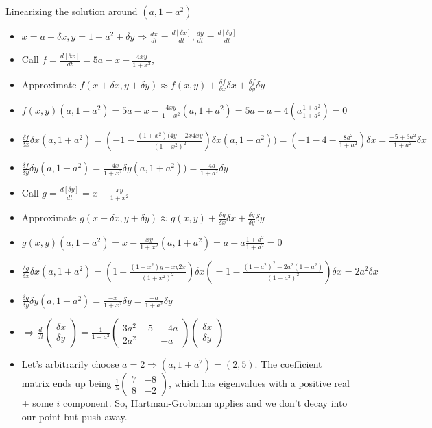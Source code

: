 \documentclass[11pt, oneside]{article}   	%
\begin{document}
Linearizing the solution around $(a, 1+a^2)$
\begin{itemize}
\item $x = a + \delta x, y = 1 + a^2 + \delta y \Rightarrow \frac{dx}{dt} = \frac{d[\delta x]}{dt}, \frac{dy}{dt} = \frac{d[\delta y]}{dt}$
\item Call $f =  \frac{d[\delta x]}{dt} = 5a - x - \frac{4xy}{1+x^2}$, 
\item Approximate $f(x + \delta x, y + \delta y) \approx f(x,y) + \frac{\delta f}{\delta x}\delta x +  \frac{\delta f}{\delta y}\delta y$
\item $f(x,y)(a, 1+a^2)= 5a - x - \frac{4xy}{1+x^2}(a, 1+a^2) = 5a - a - 4(a\frac{1+a^2}{1+a^2}) = 0$
\item $\frac{\delta f}{\delta x}\delta x (a, 1+a^2) = (-1 - \frac{(1+x^2)(4y-2x4xy}{(1+x^2)^2})\delta x (a, 1+a^2)) =(-1 - 4 - \frac{8a^2}{1+a^2})\delta x  = \frac{-5 + 3a^2}{1+a^2}\delta x $
\item $\frac{\delta f}{\delta y}\delta y (a, 1+a^2) = \frac{-4x}{1+x^2}\delta y (a, 1+a^2)) =\frac{-4a}{1+a^2}\delta y $
\item Call $g =  \frac{d[\delta y]}{dt} = x - \frac{xy}{1+x^2}$
\item Approximate $g(x + \delta x, y + \delta y) \approx g(x,y) + \frac{\delta g}{\delta x}\delta x +  \frac{\delta g}{\delta y}\delta y$
\item $g(x,y)(a, 1+a^2) = x - \frac{xy}{1+x^2}(a, 1+a^2) = a - a\frac{1+a^2}{1+a^2} = 0$
\item $\frac{\delta g}{\delta x}\delta x (a, 1+a^2) = (1 -\frac{(1+x^2)y - xy2x}{(1+x^2)^2})\delta x ( = 1 -\frac{(1+a^2)^2 - 2a^2(1+a^2)}{(1+a^2)^2})\delta x = 2a^2\delta x $
\item $\frac{\delta g}{\delta y}\delta y (a, 1+a^2) = \frac{-x}{1+x^2}\delta y = \frac{-a}{1+a^2}\delta y $
\item  $\Rightarrow \frac{d}{dt}\begin{pmatrix} \delta x \\ \delta y \end{pmatrix}  = \frac{1}{1+a^2} \begin{pmatrix}  3a^2 - 5 & -4a \\ 2a^2 & -a \end{pmatrix} \begin{pmatrix} \delta x \\ \delta y \end{pmatrix}$
\item Let's arbitrarily choose $a = 2 \Rightarrow (a, 1+a^2) = (2,5)$.  The coefficient matrix ends up being $\frac{1}{5} \begin{pmatrix} 7 & -8 \\ 8 & -2\end{pmatrix}$, which has eigenvalues with a positive real $\pm$ some $i$ component.  So, Hartman-Grobman applies and we don't decay into our point but push away.
\end{itemize}
\end{document}
